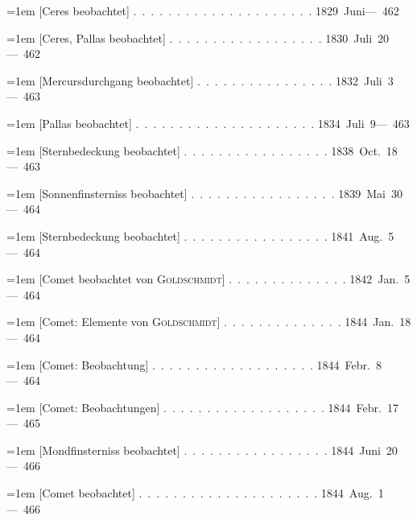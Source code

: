 \noindent\hangindent=1em [Ceres beobachtet] \mbox{.\ .\ .\ .\ .\ .\ .\ .\ .\ .\ .\ .\ .\ .\ .\ .\ .\ .\ .\ .\ .} \hfill\mbox{1829 Juni}\quad\mbox{--- 462}\par\smallskip
\noindent\hangindent=1em [Ceres, Pallas beobachtet] \mbox{.\ .\ .\ .\ .\ .\ .\ .\ .\ .\ .\ .\ .\ .\ .\ .\ .\ .} \hfill\mbox{1830 Juli 20}\quad\mbox{--- 462}\par\smallskip
\noindent\hangindent=1em [Mercursdurchgang beobachtet] \mbox{.\ .\ .\ .\ .\ .\ .\ .\ .\ .\ .\ .\ .\ .\ .\ .} \hfill\mbox{1832 Juli 3}\quad\mbox{--- 463}\par\smallskip
\noindent\hangindent=1em [Pallas beobachtet] \mbox{.\ .\ .\ .\ .\ .\ .\ .\ .\ .\ .\ .\ .\ .\ .\ .\ .\ .\ .\ .\ .} \hfill\mbox{1834 Juli 9}\quad\mbox{--- 463}\par\smallskip
\noindent\hangindent=1em [Sternbedeckung beobachtet] \mbox{.\ .\ .\ .\ .\ .\ .\ .\ .\ .\ .\ .\ .\ .\ .\ .\ .} \hfill\mbox{1838 Oct. 18}\quad\mbox{--- 463}\par\smallskip
\noindent\hangindent=1em [Sonnenfinsterniss beobachtet] \mbox{.\ .\ .\ .\ .\ .\ .\ .\ .\ .\ .\ .\ .\ .\ .\ .\ .} \hfill\mbox{1839 Mai 30}\quad\mbox{--- 464}\par\smallskip
\noindent\hangindent=1em [Sternbedeckung beobachtet] \mbox{.\ .\ .\ .\ .\ .\ .\ .\ .\ .\ .\ .\ .\ .\ .\ .\ .} \hfill\mbox{1841 Aug. 5}\quad\mbox{--- 464}\par\smallskip
\noindent\hangindent=1em [Comet beobachtet von \textsc{Goldschmidt}] \mbox{.\ .\ .\ .\ .\ .\ .\ .\ .\ .\ .\ .\ .\ .} \hfill\mbox{1842 Jan. 5}\quad\mbox{--- 464}\par\smallskip
\noindent\hangindent=1em [Comet: Elemente von \textsc{Goldschmidt}] \mbox{.\ .\ .\ .\ .\ .\ .\ .\ .\ .\ .\ .\ .\ .} \hfill\mbox{1844 Jan. 18}\quad\mbox{--- 464}\par\smallskip
\noindent\hangindent=1em [Comet: Beobachtung] \mbox{.\ .\ .\ .\ .\ .\ .\ .\ .\ .\ .\ .\ .\ .\ .\ .\ .\ .\ .} \hfill\mbox{1844 Febr. 8}\quad\mbox{--- 464}\par\smallskip
\noindent\hangindent=1em [Comet: Beobachtungen] \mbox{.\ .\ .\ .\ .\ .\ .\ .\ .\ .\ .\ .\ .\ .\ .\ .\ .\ .\ .} \hfill\mbox{1844 Febr. 17}\quad\mbox{--- 465}\par\smallskip
\noindent\hangindent=1em [Mondfinsterniss beobachtet] \mbox{.\ .\ .\ .\ .\ .\ .\ .\ .\ .\ .\ .\ .\ .\ .\ .\ .} \hfill\mbox{1844 Juni 20}\quad\mbox{--- 466}\par\smallskip
\noindent\hangindent=1em [Comet beobachtet] \mbox{.\ .\ .\ .\ .\ .\ .\ .\ .\ .\ .\ .\ .\ .\ .\ .\ .\ .\ .\ .\ .} \hfill\mbox{1844 Aug. 1}\quad\mbox{--- 466}\par\smallskip
